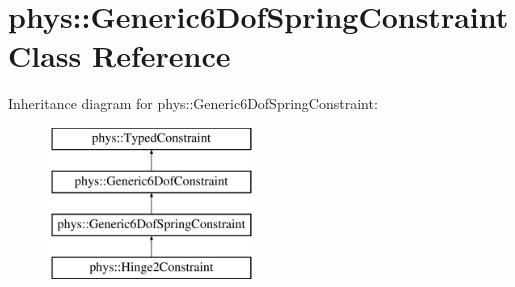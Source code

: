 \hypertarget{classphys_1_1Generic6DofSpringConstraint}{
\section{phys::Generic6DofSpringConstraint Class Reference}
\label{d1/dc7/classphys_1_1Generic6DofSpringConstraint}
}
Inheritance diagram for phys::Generic6DofSpringConstraint:\begin{figure}[H]
\begin{center}
\leavevmode
\includegraphics[height=4.000000cm]{d1/dc7/classphys_1_1Generic6DofSpringConstraint}
\end{center}
\end{figure}
